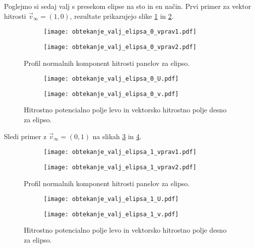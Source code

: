 \documentclass[12pt,a4paper]{article}
\begin{document}
Poglejmo si sedaj valj s presekom elipse na sto in en način. Prvi primer za vektor hitrosti
 $\vec{v}_{\infty}=(1, 0)$, rezultate prikazujejo slike \ref{fig:slika12} in \ref{fig:slika13}.

\begin{figure}[H]
    \centering
    \begin{subfigure}[b]{0.45\textwidth}  			
        \texttt{[image: obtekanje\_valj\_elipsa\_0\_vprav1.pdf]}
    \end{subfigure}
    \begin{subfigure}[b]{0.45\textwidth}  			
        \texttt{[image: obtekanje\_valj\_elipsa\_0\_vprav2.pdf]}
    \end{subfigure}
    \caption{Profil normalnih komponent hitrosti panelov za elipso.} \label{fig:slika12}
\end{figure}

\begin{figure}[H]
    \centering
    \begin{subfigure}[b]{0.45\textwidth}  			
        \texttt{[image: obtekanje\_valj\_elipsa\_0\_U.pdf]}
    \end{subfigure}
    \begin{subfigure}[b]{0.45\textwidth}  			
        \texttt{[image: obtekanje\_valj\_elipsa\_0\_v.pdf]}
    \end{subfigure}
    \caption{Hitrostno potencialno polje levo in vektorsko hitrostno polje desno za elipso.} \label{fig:slika13}
\end{figure}

\noindent Sledi primer z $\vec{v}_{\infty}=(0, 1)$ na slikah \ref{fig:slika14} in \ref{fig:slika15}.

\begin{figure}[H]
    \centering
    \begin{subfigure}[b]{0.45\textwidth}  			
        \texttt{[image: obtekanje\_valj\_elipsa\_1\_vprav1.pdf]}
    \end{subfigure}
    \begin{subfigure}[b]{0.45\textwidth}  			
        \texttt{[image: obtekanje\_valj\_elipsa\_1\_vprav2.pdf]}
    \end{subfigure}
    \caption{Profil normalnih komponent hitrosti panelov za elipso.} \label{fig:slika14}
\end{figure}

\begin{figure}[H]
    \centering
    \begin{subfigure}[b]{0.45\textwidth}  			
        \texttt{[image: obtekanje\_valj\_elipsa\_1\_U.pdf]}
    \end{subfigure}
    \begin{subfigure}[b]{0.45\textwidth}  			
        \texttt{[image: obtekanje\_valj\_elipsa\_1\_v.pdf]}
    \end{subfigure}
    \caption{Hitrostno potencialno polje levo in vektorsko hitrostno polje desno za elipso.} \label{fig:slika15}
\end{figure}
\end{document}
